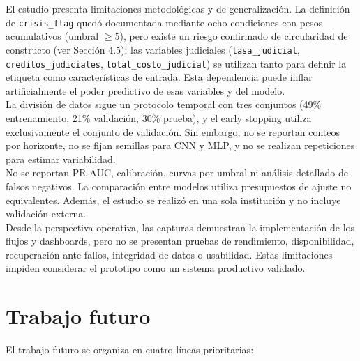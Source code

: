 El estudio presenta limitaciones metodológicas y de generalización. La definición de \texttt{crisis\_flag} quedó documentada mediante ocho condiciones con pesos acumulativos (umbral $\geq 5$), pero existe un riesgo confirmado de circularidad de constructo (ver Sección 4.5): las variables judiciales (\texttt{tasa\_judicial}, \texttt{creditos\_judiciales}, \texttt{total\_costo\_judicial}) se utilizan tanto para definir la etiqueta como características de entrada. Esta dependencia puede inflar artificialmente el poder predictivo de esas variables y del modelo.\\

La división de datos sigue un protocolo temporal con tres conjuntos (49\% entrenamiento, 21\% validación, 30\% prueba), y el early stopping utiliza exclusivamente el conjunto de validación. Sin embargo, no se reportan conteos por horizonte, no se fijan semillas para CNN y MLP, y no se realizan repeticiones para estimar variabilidad.\\

No se reportan PR-AUC, calibración, curvas por umbral ni análisis detallado de falsos negativos. La comparación entre modelos utiliza presupuestos de ajuste no equivalentes. Además, el estudio se realizó en una sola institución y no incluye validación externa.\\

Desde la perspectiva operativa, las capturas demuestran la implementación de los flujos y dashboards, pero no se presentan pruebas de rendimiento, disponibilidad, recuperación ante fallos, integridad de datos o usabilidad. Estas limitaciones impiden considerar el prototipo como un sistema productivo validado.

\section{Trabajo futuro}

El trabajo futuro se organiza en cuatro líneas prioritarias:

